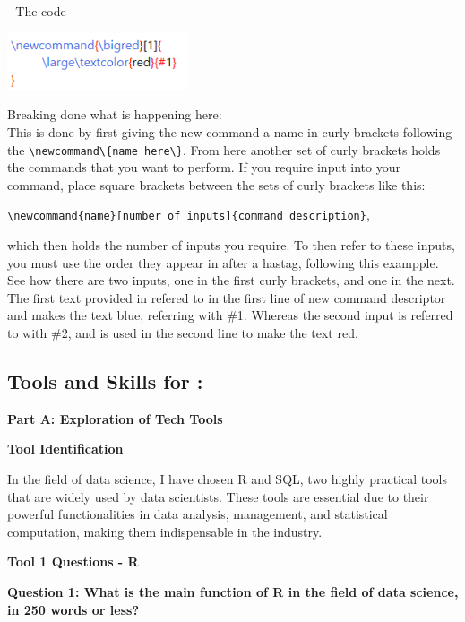 \documentclass[a4paper, 11pt]{report}
\begin{document}
\vspace{\baselineskip}
- The code

 \includegraphics[width=0.4\textwidth]{commandcode}

\vspace{\baselineskip}
Breaking done what is happening here: \\
\noindent This is done by first giving the new command a name in curly brackets following the  \verb|\newcommand\{name here\}|. From here another set of curly brackets holds the commands that you want to perform. If you require input into your command, place square brackets between the sets of curly brackets like this:

\verb|\newcommand{name}[number of inputs]{command description}|, 

which then holds the number of inputs you require. To then refer to these inputs, you must use the order they appear in after a hastag, following this exampple. See how there are two inputs, one in the first curly brackets, and one in the next. The first text provided in refered to in the first line of new command descriptor and makes the text blue, referring with \#1. Whereas the second input is referred to with \#2, and is used in the second line to make the text red. 



\subsection{Tools and Skills for \majB: \studB}

\textbf{\large{Part A: Exploration of Tech Tools}}

\textbf{\large{Tool Identification}}

In the field of data science, I have chosen R and SQL, two highly practical tools that are widely used by data scientists. These tools are essential due to their powerful functionalities in data analysis, management, and statistical computation, making them indispensable in the industry.

\vspace{\baselineskip}

\textbf{\large{Tool 1 Questions - R}}

\textbf{Question 1: What is the main function of R in the field of data science, in 250 words or less?}
\end{document}
